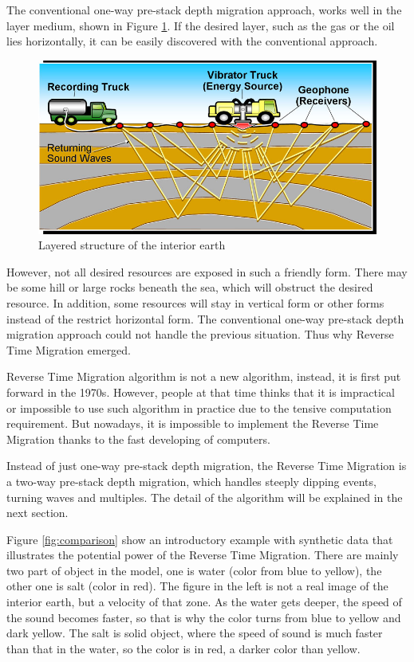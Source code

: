 The conventional one-way pre-stack depth migration approach, works well in
the layer medium, shown in Figure \ref{fig:layer_structure}. If the desired
layer, such as the gas or the oil lies horizontally, it can be easily
discovered with the conventional approach.

\begin{figure}[h]
  \centering
  \includegraphics[scale=.45]{img/layer_structure.jpg}
  \caption{Layered structure of the interior earth}
  \label{fig:layer_structure}
\end{figure}

However, not all desired resources are exposed in such a friendly form.
There may be some hill or large rocks beneath the sea, which will obstruct
the desired resource. In addition, some resources will stay in vertical
form or other forms instead of the restrict horizontal form. The
conventional one-way pre-stack depth migration approach could not handle
the previous situation. Thus why Reverse Time Migration emerged.

Reverse Time Migration algorithm is not a new algorithm, instead, it is
first put forward in the 1970s. However, people at that time thinks that it
is impractical or impossible to use such algorithm in practice due to the
tensive  computation requirement. But nowadays, it is impossible to
implement the Reverse Time Migration thanks to the fast developing of
computers.

Instead of just one-way pre-stack depth migration, the Reverse Time
Migration is a two-way pre-stack depth migration, which handles steeply
dipping events, turning waves and multiples. The detail of the algorithm
will be explained in the next section.

Figure \ref{fig:comparison} show an introductory example with synthetic
data that illustrates the potential power of the Reverse Time Migration.
There are mainly two part of object in the model, one is water (color from
blue to yellow), the other one is salt (color in red). The figure in the
left is not a real image of the interior earth, but a velocity of that
zone. As the water gets deeper, the speed of the sound becomes faster, so
that is why the color turns from blue to yellow and dark yellow. The salt
is solid object, where the speed of sound is much faster than that in the
water, so the color is in red, a darker color than yellow.

